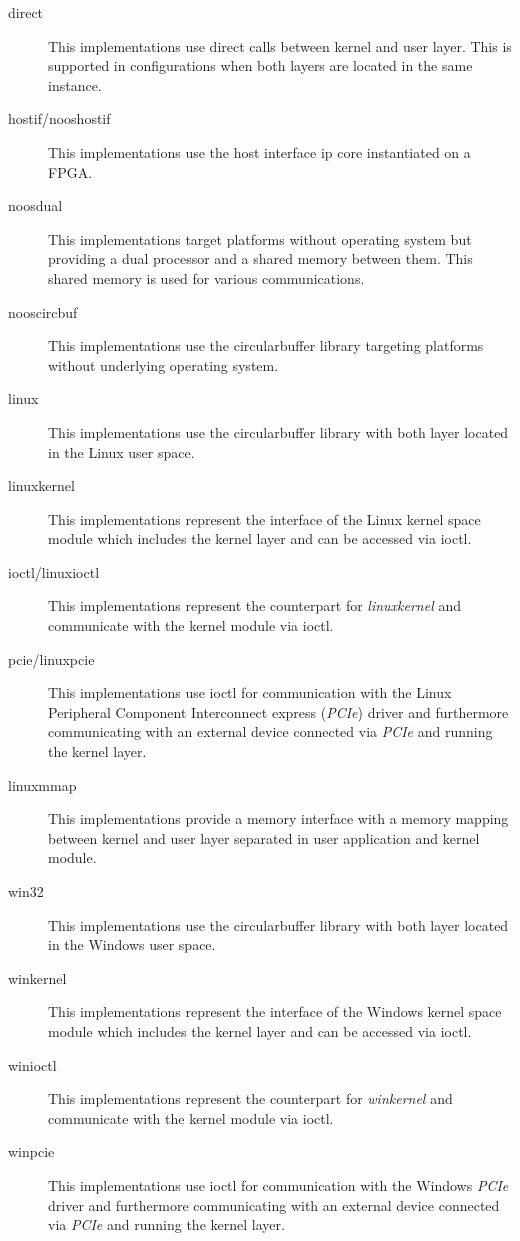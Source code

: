 \begin{description}
    \item[direct] This implementations use direct calls between kernel and user layer.
    This is supported in configurations when both layers are located in the same instance.
    \item[hostif/nooshostif] This implementations use the host interface ip core instantiated on a FPGA.
    \item[noosdual] This implementations target platforms without operating system but providing a dual processor and a shared memory between them.
    This shared memory is used for various communications.
    \item[nooscircbuf] This implementations use the circularbuffer library targeting platforms without underlying operating system.
    \item[linux] This implementations use the circularbuffer library with both layer located in the Linux user space.
    \item[linuxkernel] This implementations represent the interface of the Linux kernel space module which includes the kernel layer and can be accessed via ioctl.
    \item[ioctl/linuxioctl] This implementations represent the counterpart for \emph{linuxkernel} and communicate with the kernel module via ioctl.
    \item[pcie/linuxpcie] This implementations use ioctl for communication with the Linux Peripheral Component Interconnect express (\emph{PCIe}) driver and furthermore communicating with an external device connected via \emph{PCIe} and running the kernel layer.
    \item[linuxmmap] This implementations provide a memory interface with a memory mapping between kernel and user layer separated in user application and kernel module.
    \item[win32] This implementations use the circularbuffer library with both layer located in the Windows user space.
    \item[winkernel] This implementations represent the interface of the Windows kernel space module which includes the kernel layer and can be accessed via ioctl.
    \item[winioctl] This implementations represent the counterpart for \emph{winkernel} and communicate with the kernel module via ioctl.
    \item[winpcie] This implementations use ioctl for communication with the Windows \emph{PCIe} driver and furthermore communicating with an external device connected via \emph{PCIe} and running the kernel layer.

\end{description}
